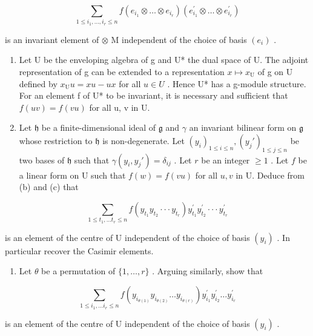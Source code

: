\[
\sum_ {1 \leqslant i _ {1}, \dots , i _ {r} \leqslant n} f (e _ {i _ {1}} \otimes \dots \otimes e _ {i _ {r}}) (e _ {i _ {1}} ^ {\prime} \otimes \dots \otimes e _ {i _ {r}} ^ {\prime})
\]

is an invariant element of \(\otimes\) M independent of the choice of basis \((e_i)\) .

\begin{enumerate}
\def\labelenumi{(\alph{enumi})}
\setcounter{enumi}{2}
\item
  Let U be the enveloping algebra of g and U* the dual space of U. The adjoint representation of g can be extended to a representation \(x \mapsto x_{\mathrm{U}}\) of g on U defined by \(x_{\mathrm{U}}u = xu - ux\) for all \(u \in U\) . Hence U* has a g-module structure. For an element f of U* to be invariant, it is necessary and sufficient that \(f(uv) = f(vu)\) for all u, v in U.
\item
  Let \(\mathfrak{h}\) be a finite-dimensional ideal of \(\mathfrak{g}\) and \(\gamma\) an invariant bilinear form on \(\mathfrak{g}\) whose restriction to \(\mathfrak{h}\) is non-degenerate. Let \((y_i)_{1\leq i\leq n}, (y_j')_{1\leq j\leq n}\) be two bases of \(\mathfrak{h}\) such that \(\gamma(y_i,y_j') = \delta_{ij}\) . Let \(r\) be an integer \(\geqslant 1\) . Let \(f\) be a linear form on U such that \(f(w) = f(vu)\) for all \(u,v\) in U. Deduce from (b) and (c) that
\end{enumerate}

\[
\sum_ {1 \leqslant t _ {1}, \dots t _ {r} \leqslant n} f (y _ {t _ {1}} y _ {t _ {2}} \cdot \cdot \cdot y _ {t _ {r}}) y _ {t _ {1}} ^ {\prime} y _ {t _ {2}} ^ {\prime} \cdot \cdot \cdot y _ {t _ {r}} ^ {\prime}
\]

is an element of the centre of U independent of the choice of basis \((y_{i})\) . In particular recover the Casimir elements.

\begin{enumerate}
\def\labelenumi{(\alph{enumi})}
\setcounter{enumi}{4}
\tightlist
\item
  Let \(\theta\) be a permutation of \(\{1, \ldots, r\}\) . Arguing similarly, show that
\end{enumerate}

\[
\sum_ {1 \leqslant i _ {1}, \dots i _ {r} \leqslant n} f (y _ {i _ {\theta (1)}} y _ {i _ {\theta (2)}} \dots y _ {i _ {\theta (r)}}) y _ {i _ {1}} ^ {\prime} y _ {i _ {2}} ^ {\prime} \dots y _ {i _ {r}} ^ {\prime}
\]

is an element of the centre of U independent of the choice of basis \((y_{i})\) .

